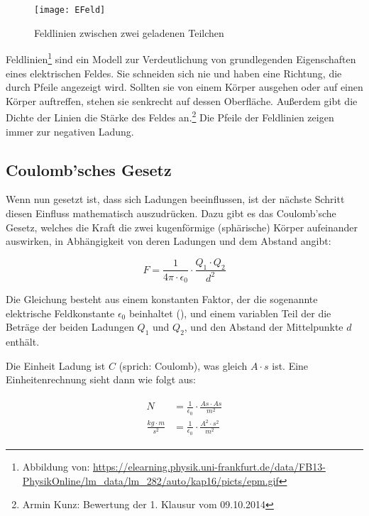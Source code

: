 \begin{figure}
	\centering
	\texttt{[image: EFeld]}
	\caption{Feldlinien zwischen zwei geladenen Teilchen}
\end{figure}

Feldlinien\footnote{Abbildung von: \url{https://elearning.physik.uni-frankfurt.de/data/FB13-PhysikOnline/lm_data/lm_282/auto/kap16/picts/epm.gif}} sind ein Modell zur Verdeutlichung von grundlegenden Eigenschaften eines elektrischen Feldes. Sie schneiden sich nie und haben eine Richtung, die durch Pfeile angezeigt wird. Sollten sie von einem Körper ausgehen oder auf einen Körper auftreffen, stehen sie senkrecht auf dessen Oberfläche. Außerdem gibt die Dichte der Linien die Stärke des Feldes an.\footnote{Armin Kunz: Bewertung der 1. Klausur vom 09.10.2014} Die Pfeile der Feldlinien zeigen immer zur negativen Ladung.


\subsection{Coulomb'sches Gesetz} \label{subsec:CoulombGesetz}

Wenn nun gesetzt ist, dass sich Ladungen beeinflussen, ist der nächste Schritt diesen \glqq Einfluss\grqq{} mathematisch auszudrücken. Dazu gibt es das Coulomb'sche Gesetz, welches die Kraft die zwei kugenförmige (sphärische) Körper aufeinander auswirken, in Abhängigkeit von deren Ladungen und dem Abstand angibt:

\begin{equation} \label{eq:coulomb_gesetz}
	F = \frac{1}{4\pi \cdot \epsilon_0} \cdot \frac{Q_1 \cdot Q_2}{d^{2}}
\end{equation}

Die Gleichung besteht aus einem konstanten Faktor, der die sogenannte \glqq elektrische Feldkonstante\grqq{} $\epsilon_0$ beinhaltet (), und einem variablen Teil der die Beträge der beiden Ladungen $Q_1$ und $Q_2$, und den Abstand der Mittelpunkte $d$ enthält.

Die Einheit Ladung ist $C$ (sprich: Coulomb), was gleich $A \cdot s$ ist. Eine Einheitenrechnung sieht dann wie folgt aus:

\begin{align}\label{eq:coulomb_gesetz_einheiten}
\begin{split}
	N 							&= \frac{1}{\epsilon_0} \cdot \frac{As \cdot As}{m^{2}} \\
	\frac{kg \cdot m}{s^{2}} 	&= \frac{1}{\epsilon_0} \cdot \frac{A^{2} \cdot s^{2}}{m^{2}}
\end{split}
\end{align}

